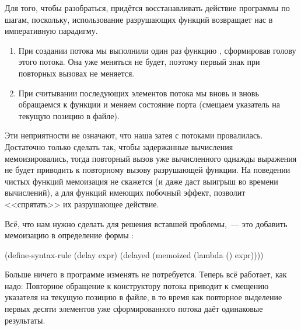 {Для того, чтобы разобраться, придётся восстанавливать действие программы по шагам, поскольку, использование разрушающих функций возвращает нас в императивную парадигму.
\begin{enumerate}
\item При создании потока  мы выполнили один раз функцию , сформировав голову этого потока. Она уже меняться не будет, поэтому первый знак \s{#\o} при повторных вызовах не меняется.
\item При считывании последующих элементов потока мы вновь и вновь обращаемся к функции   и меняем состояние порта (смещаем указатель на текущую позицию в файле).
\end{enumerate}

Эти неприятности не означают, что наша затея с потоками провалилась. Достаточно только сделать так, чтобы задержанные вычисления мемоизировались, тогда повторный вызов уже вычисленного однажды выражения не будет приводить к повторному вызову разрушающей функции. На поведении чистых функций мемоизация не скажется (и даже даст выигрыш во времени вычислений), а для функций имеющих побочный эффект, позволит <<спрятать>> их разрушающее действие.

Всё, что нам нужно сделать для решения вставшей проблемы,~--- это добавить мемоизацию в определение формы :
\begin{Definition}
(define-syntax-rule (delay expr)
  (delayed (memoized (lambda () expr))))
\end{Definition}
Больше ничего в программе изменять не потребуется. Теперь всё работает, как надо: 
\vspace{-\smallskipamount}
\newpage
\noindent
Повторное обращение к конструктору потока  приводит к смещению указателя на текущую позицию в файле, в то время как повторное выделение первых десяти элементов уже сформированного потока  даёт одинаковые результаты.

}
